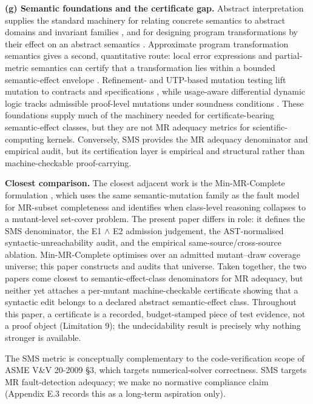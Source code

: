 \documentclass[manuscript,screen,review]{acmart}
\begin{document}
\textbf{(g) Semantic foundations and the certificate gap.} Abstract
interpretation supplies the standard machinery for relating concrete
semantics to abstract domains and invariant families \citep{46aba24d3e925f6d8d2efd5b5f6ee0d5ea7558cd},
and for designing program transformations by their effect on an
abstract semantics \citep{72269d5ab33ed790ece6856ba0309ed070d83622}. Approximate program
transformation semantics gives a second, quantitative route: local error
expressions and partial-metric semantics can certify that a
transformation lies within a bounded semantic-effect envelope \citep{11efca8804ed387c9cc3956868f0eb43597c8d10,6d492b783178b02dae163fbfe837857b982deed2}. Refinement- and
UTP-based mutation testing lift mutation to contracts and
specifications \citep{92d99528fe8e70345901cf56aa4d1037f0c3aa96,97a550b469c6151734d1220e37a7985d896191ee}, while
usage-aware differential dynamic logic tracks admissible proof-level
mutations under soundness conditions \citep{7a867d014c3e10e45e4220c5dcf605e8df6ef38d}. These foundations supply much of the machinery needed for
certificate-bearing semantic-effect classes, but they are not MR
adequacy metrics for scientific-computing kernels. Conversely, SMS
provides the MR adequacy denominator and empirical audit, but its
certification layer is empirical and structural rather than
machine-checkable proof-carrying.

\textbf{Closest comparison.} The closest adjacent work is the
Min-MR-Complete formulation \citep{li2026minmrcomplete}, which uses
the same semantic-mutation family as the fault model for MR-subset
completeness and identifies when class-level reasoning collapses to a
mutant-level set-cover problem. The present paper differs in role: it
defines the SMS denominator, the E1 $\wedge$ E2 admission judgement, the
AST-normalised syntactic-unreachability audit, and the empirical
same-source/cross-source ablation. Min-MR-Complete optimises over an
admitted mutant--draw coverage universe; this paper constructs and
audits that universe. Taken together, the two papers come closest to
semantic-effect-class denominators for MR adequacy, but neither yet
attaches a per-mutant machine-checkable certificate showing that a
syntactic edit belongs to a declared abstract semantic-effect class.
Throughout this paper, a certificate is a recorded, budget-stamped
piece of test evidence, not a proof object (Limitation 9); the
undecidability result is precisely why nothing stronger is available.

The SMS metric is conceptually complementary to the code-verification
scope of ASME V\&V 20-2009 §3, which targets numerical-solver
correctness. SMS targets MR fault-detection adequacy; we make no
normative compliance claim (Appendix E.3 records this as a long-term
aspiration only).
\end{document}
